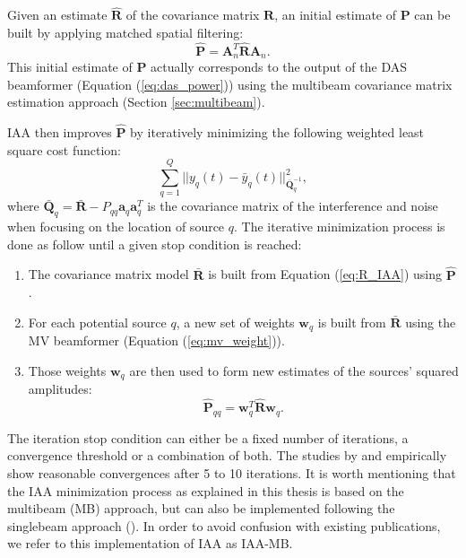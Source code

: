 Given an estimate $\boldsymbol{\hat{R}}$ of the covariance matrix $\boldsymbol{R}$, an initial estimate of $\boldsymbol{P}$ can be built by applying matched spatial filtering:
\begin{equation}
    \boldsymbol{\hat{P}} = \boldsymbol{A}_n^T \boldsymbol{\hat{R}} \boldsymbol{A}_n.
\end{equation}
\noindent
This initial estimate of $\boldsymbol{P}$ actually corresponds to the output of the DAS beamformer (Equation (\ref{eq:das_power})) using the multibeam covariance matrix estimation approach (Section \ref{sec:multibeam}).

IAA then improves $\boldsymbol{\hat{P}}$ by iteratively minimizing the following weighted least square cost function:
\begin{equation}
    \sum_{q=1}^Q || y_q(t) - \bar{y}_q(t) ||^2_{\boldsymbol{\bar{Q}}^{-1}_q},
\end{equation}
\noindent
where $\boldsymbol{\bar{Q}}_q = \boldsymbol{\bar{R}} - P_{qq} \boldsymbol{a}_q \boldsymbol{a}_q^T$ is the covariance matrix of the interference and noise when focusing on the location of source $q$.
The iterative minimization process is done as follow until a given stop condition is reached:
\begin{enumerate}
    \item The covariance matrix model $\boldsymbol{\bar{R}}$ is built from Equation (\ref{eq:R_IAA}) using $\boldsymbol{\hat{P}}$.
    \item For each potential source $q$, a new set of weights $\boldsymbol{w}_q$ is built from $\boldsymbol{\bar{R}}$ using the MV beamformer (Equation (\ref{eq:mv_weight})).
    \item Those weights $\boldsymbol{w}_q$ are then used to form new estimates of the sources' squared amplitudes:
    \begin{equation}
        \boldsymbol{\hat{P}}_{qq} = \boldsymbol{w}_q^T \boldsymbol{\hat{R}} \boldsymbol{w}_q.
    \end{equation}
\end{enumerate}
\noindent
The iteration stop condition can either be a fixed number of iterations, a convergence threshold or a combination of both.
The studies by \cite{Yardibi_nonparametric_IAA} and \cite{Jensen_IAA} empirically show reasonable convergences after 5 to 10 iterations.
It is worth mentioning that the IAA minimization process as explained in this thesis is based on the multibeam (MB) approach, but can also be implemented following the singlebeam approach (\cite{Jensen_IAA}). In order to avoid confusion with existing publications, we refer to this implementation of IAA as IAA-MB.

